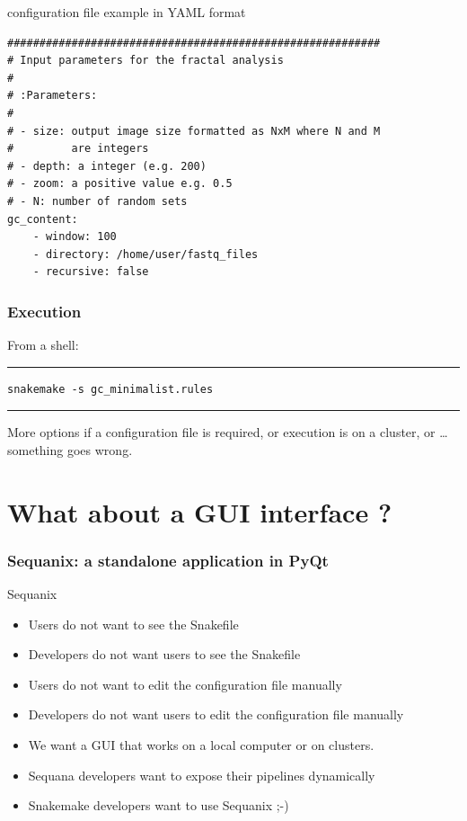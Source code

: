 \documentclass{beamer}
\begin{document}
\begin{frame}[fragile]
\begin{block}{configuration file example in YAML format}
 \begin{lstlisting}
##########################################################
# Input parameters for the fractal analysis
#
# :Parameters: 
#
# - size: output image size formatted as NxM where N and M 
#         are integers
# - depth: a integer (e.g. 200)
# - zoom: a positive value e.g. 0.5
# - N: number of random sets
gc_content:
    - window: 100
    - directory: /home/user/fastq_files
    - recursive: false
 \end{lstlisting}
\end{block}
\end{frame}


\begin{frame}[fragile]
\frametitle{Execution}

From a shell:
\rule{\textwidth}{1pt}


\begin{lstlisting}[basicstyle=\ttfamily\large]
snakemake -s gc_minimalist.rules
\end{lstlisting}

\rule{\textwidth}{1pt}

More options if a configuration file is required, or execution is on a cluster, 
or \dots something goes wrong.
\end{frame}


\section{What about a GUI interface ?}
\begin{frame}
\frametitle{Sequanix: a standalone application in PyQt}

\begin{block}{Sequanix}
\begin{itemize}
 \item Users do not want to see the Snakefile
 \item Developers do not want users to see the Snakefile
 \pause
 \item Users do not want to edit the configuration file manually
 \item Developers do not want users to edit the configuration file manually
 \pause
 \item We want a GUI that works on a local computer or on clusters.
 \pause
 \item Sequana developers want to expose their pipelines dynamically
 \pause
 \item Snakemake developers want to use Sequanix ;-) 
\end{itemize}
\end{block}
\end{frame}
\end{document}
